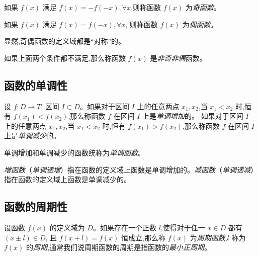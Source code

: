 \documentclass[lang=cn,10pt,twoside]{elegantbook}
\begin{document}
如果 $f(x)$ 满足 $f(x) = -f(-x), \forall x$,则称函数 $f(x)$ 为\emph{奇函数}。

如果 $f(x)$ 满足 $f(x) = f(-x), \forall x$, 则称函数 $f(x)$ 为\emph{偶函数}。

显然,奇偶函数的定义域都是“对称”的。

如果上面两个条件都不满足,那么称函数 $f(x)$ 是\emph{非奇非偶}函数。

\subsection{函数的单调性}

设 $f: D \rightarrow T$, 区间 $I \subset D$。如果对于区间 $I$ 上的任意两点 $x_1, x_2$,当 $x_1 < x_2$ 时,恒有 $f(x_1) < f(x_2)$,那么称函数 $f$ 在区间 $I$ 上是\emph{单调增加}的。
如果对于区间 $I$ 上的任意两点 $x_1, x_2$,当 $x_1 < x_2$ 时,恒有 $f(x_1) > f(x_2)$,那么称函数 $f$ 在区间 $I$ 上是\emph{单调减少}的。

单调增加和单调减少的函数统称为\emph{单调函数}。

\emph{增函数}（\emph{单调递增}）指在函数的定义域上函数是单调增加的。\emph{减函数}（\emph{单调递减}）指在函数的定义域上函数是单调减少的。

\subsection{函数的周期性}

设函数 $f(x)$ 的定义域为 $D$。如果存在一个正数 $l$,使得对于任一 $x \in D$ 都有 $(x \pm l) \in D$, 且 $f(x+l)=f(x)$ 恒成立,那么称 $f(x)$ 为\emph{周期函数},$l$ 称为 $f(x)$ 的\emph{周期},通常我们说周期函数的周期是指函数的\emph{最小正周期}。

\newpage
\end{document}
